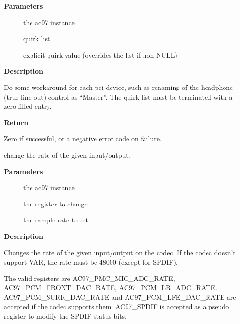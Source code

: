 \documentclass[a4paper,8pt,english]{sphinxmanual}
\begin{document}
\textbf{Parameters}
\begin{description}
\item[{}] \leavevmode
the ac97 instance

\item[{}] \leavevmode
quirk list

\item[{}] \leavevmode
explicit quirk value (overrides the list if non-NULL)

\end{description}

\textbf{Description}

Do some workaround for each pci device, such as renaming of the
headphone (true line-out) control as ``Master''.
The quirk-list must be terminated with a zero-filled entry.

\textbf{Return}

Zero if successful, or a negative error code on failure.

\begin{fulllineitems}
\label{sound/kernel-api/alsa-driver-api:c.snd_ac97_set_rate}
change the rate of the given input/output.

\end{fulllineitems}


\textbf{Parameters}
\begin{description}
\item[{}] \leavevmode
the ac97 instance

\item[{}] \leavevmode
the register to change

\item[{}] \leavevmode
the sample rate to set

\end{description}

\textbf{Description}

Changes the rate of the given input/output on the codec.
If the codec doesn't support VAR, the rate must be 48000 (except
for SPDIF).

The valid registers are AC97\_PMC\_MIC\_ADC\_RATE,
AC97\_PCM\_FRONT\_DAC\_RATE, AC97\_PCM\_LR\_ADC\_RATE.
AC97\_PCM\_SURR\_DAC\_RATE and AC97\_PCM\_LFE\_DAC\_RATE are accepted
if the codec supports them.
AC97\_SPDIF is accepted as a pseudo register to modify the SPDIF
status bits.
\end{document}
